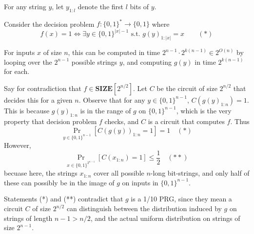 \documentclass{article}
\newcommand{\SIZE}{\mathbf{SIZE}}
\begin{document}
For any string $y$, let $y_{1:l}$ denote the first $l$ bits of $y$.

Consider the decision problem $f : \{0, 1\}^* \to \{0, 1\}$ where
$$
f(x) = 1 \iff \exists y \in \{0, 1\}^{|x| - 1} \text{ s.t. } g(y)_{1:|x|} = x \qquad (*)
$$

For inputs $x$ of size $n$, this can be computed in time $2^{n-1} \cdot 2^{k(n-1)} \in 2^{O(n)}$ by looping over the $2^{n-1}$ possible strings $y$, and computing $g(y)$ in time $2^{k(n-1)}$ for each.

Say for contradiction that $f \in \SIZE[2^{n/2}]$.  Let $C$ be the circuit of size $2^{n/2}$ that decides this for a given $n$.
Observe that for any $y \in \{0, 1\}^{n-1}$, $C(g(y)_{1:n}) = 1$.
This is because $g(y)_{1:n}$ is in the range of $g$ on $\{0, 1\}^{n-1}$, which is the very property that decision problem $f$ checks, and $C$ is a circuit that computes $f$.
Thus
$$
\Pr_{y \in \{0, 1\}^{n-1}}[C(g(y))_{1:n} = 1] = 1 \quad (*)
$$
However,
$$
\Pr_{x \in \{0, 1\}^{2^{n-1}}}[C(x_{1:n}) = 1] \leq \frac{1}{2} \quad (**)
$$
becuase here, the strings $x_{1:n}$ cover all possible $n$-long bit-strings,
and only half of these can possibly be in the image of $g$ on inputs in $\{0, 1\}^{n-1}$.

Statements (*) and (**) contradict that $g$ is a 1/10 PRG,
since they mean a circuit $C$ of size $2^{n/2}$ can distinguish between the distribution
induced by $g$ on strings of length $n - 1 > n/2$, and the actual uniform distribution on strings of size $2^{n-1}$.




\end{document}
